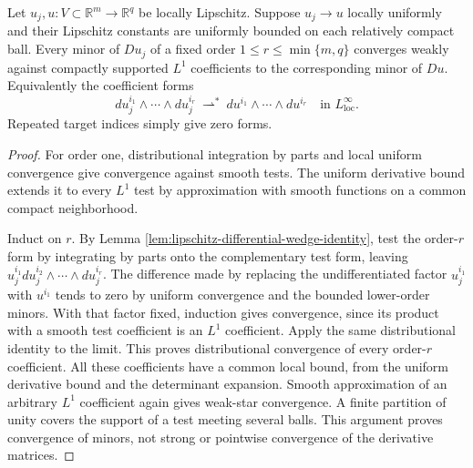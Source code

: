 \begin{proposition}\label{prop:uniform-lipschitz-weak-minors}
Let $u_j,u:V\subset\mathbb R^m\to\mathbb R^q$ be locally Lipschitz. Suppose $u_j\to u$ locally uniformly and their Lipschitz constants are uniformly bounded on each relatively compact ball. Every minor of $Du_j$ of a fixed order $1\leq r\leq\min\{m,q\}$ converges weakly against compactly supported $L^1$ coefficients to the corresponding minor of $Du$. Equivalently the coefficient forms
\[
 du_j^{i_1}\wedge\cdots\wedge du_j^{i_r}
 \ \rightharpoonup^*\ 
 du^{i_1}\wedge\cdots\wedge du^{i_r}
 \quad\text{in }L^\infty_{\mathrm{loc}}.
\]
Repeated target indices simply give zero forms.
\end{proposition}
\begin{proof}
For order one, distributional integration by parts and local uniform convergence give convergence against smooth tests. The uniform derivative bound extends it to every $L^1$ test by approximation with smooth functions on a common compact neighborhood.

Induct on $r$. By Lemma \ref{lem:lipschitz-differential-wedge-identity}, test the order-$r$ form by integrating by parts onto the complementary test form, leaving
$u_j^{i_1}du_j^{i_2}\wedge\cdots\wedge du_j^{i_r}$.
The difference made by replacing the undifferentiated factor $u_j^{i_1}$ with $u^{i_1}$ tends to zero by uniform convergence and the bounded lower-order minors. With that factor fixed, induction gives convergence, since its product with a smooth test coefficient is an $L^1$ coefficient. Apply the same distributional identity to the limit. This proves distributional convergence of every order-$r$ coefficient. All these coefficients have a common local bound, from the uniform derivative bound and the determinant expansion. Smooth approximation of an arbitrary $L^1$ coefficient again gives weak-star convergence. A finite partition of unity covers the support of a test meeting several balls. This argument proves convergence of minors, not strong or pointwise convergence of the derivative matrices.
\end{proof}

